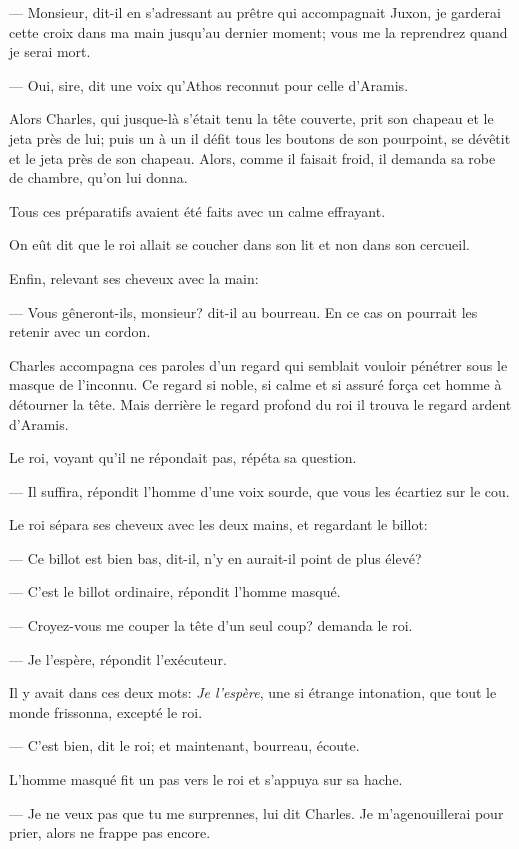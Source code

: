 — Monsieur, dit-il en s'adressant au prêtre qui accompagnait Juxon, je garderai cette croix dans ma main jusqu'au dernier moment; vous me la reprendrez quand je serai mort.

— Oui, sire, dit une voix qu'Athos reconnut pour celle d'Aramis.

Alors Charles, qui jusque-là s'était tenu la tête couverte, prit son chapeau et le jeta près de lui; puis un à un il défit tous les boutons de son pourpoint, se dévêtit et le jeta près de son chapeau. Alors, comme il faisait froid, il demanda sa robe de chambre, qu'on lui donna.

Tous ces préparatifs avaient été faits avec un calme effrayant.

On eût dit que le roi allait se coucher dans son lit et non dans son cercueil.

Enfin, relevant ses cheveux avec la main:

— Vous gêneront-ils, monsieur? dit-il au bourreau. En ce cas on pourrait les retenir avec un cordon.

Charles accompagna ces paroles d'un regard qui semblait vouloir pénétrer sous le masque de l'inconnu. Ce regard si noble, si calme et si assuré força cet homme à détourner la tête. Mais derrière le regard profond du roi il trouva le regard ardent d'Aramis.

Le roi, voyant qu'il ne répondait pas, répéta sa question.

— Il suffira, répondit l'homme d'une voix sourde, que vous les écartiez sur le cou.

Le roi sépara ses cheveux avec les deux mains, et regardant le billot:

— Ce billot est bien bas, dit-il, n'y en aurait-il point de plus élevé?

— C'est le billot ordinaire, répondit l'homme masqué.

— Croyez-vous me couper la tête d'un seul coup? demanda le roi.

— Je l'espère, répondit l'exécuteur.

Il y avait dans ces deux mots: \textit{Je l'espère}, une si étrange intonation, que tout le monde frissonna, excepté le roi.

— C'est bien, dit le roi; et maintenant, bourreau, écoute.

L'homme masqué fit un pas vers le roi et s'appuya sur sa hache.

— Je ne veux pas que tu me surprennes, lui dit Charles. Je m'agenouillerai pour prier, alors ne frappe pas encore.


